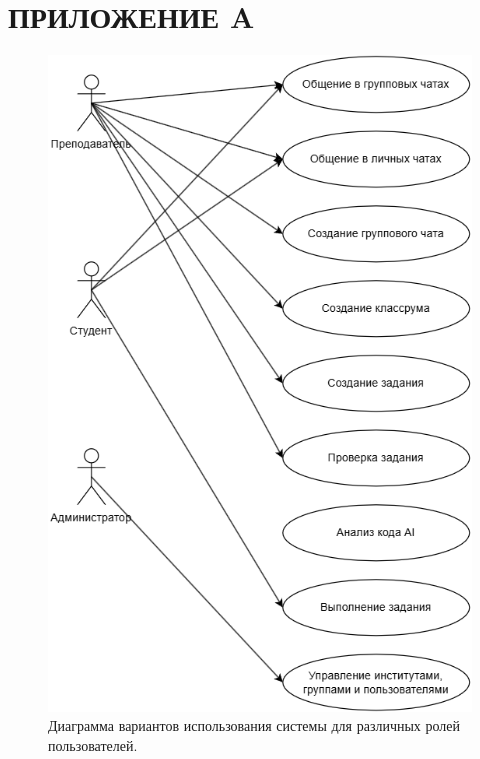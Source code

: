 
\newpage

\section*{ПРИЛОЖЕНИЕ A}

\setcounter{figure}{0} 
\makeatletter
  \renewcommand{\thefigure}{A.\arabic{figure}}
\makeatother


\begin{figure}[H]
\centering
\includegraphics[width=0.5\linewidth]{static/useCaseDiagramm}
\caption{Диаграмма вариантов использования системы для различных ролей пользователей.}
\label{fig:usecasediagramm}
\end{figure}

